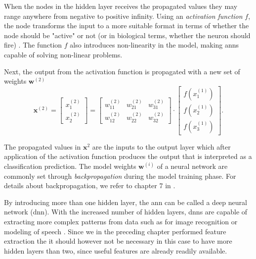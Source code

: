 When the nodes in the hidden layer receives the propagated values they may range anywhere from negative to positive infinity. Using an \textit{activation function} $f$, the node transforms the input to a more suitable format in terms of whether the node should be "active" or not (or in biological terms, whether the neuron should fire) \citep{kriesel_2007}. The function $f$ also introduces non-linearity in the model, making \gls{ann}s capable of solving non-linear problems. 

Next, the output from the activation function is propagated with a new set of weights $\mathbf{w}^{(2)}$
\begin{equation}
	\mathbf{x}^{(2)}=\begin{bmatrix}x_1^{(2)} \\ x_2^{(2)} \end{bmatrix} = 
	\begin{bmatrix} w_{11}^{(2)} & w_{21}^{(2)} & w_{31}^{(2)} \\ w_{12}^{(2)} & w_{22}^{(2)} & w_{32}^{(2)} \end{bmatrix}\cdot \begin{bmatrix}f(x_1^{(1)}) \\ f(x_2^{(1)}) \\ f(x_3^{(1)}) \end{bmatrix}.
\end{equation}

The propagated values in $\mathbf{x}^2$ are the inputs to the output layer which after application of the activation function produces the output that is interpreted as a classification prediction. The model weights $\mathbf{w}^{(i)}$ of a neural network are commonly set through \textit{backpropagation} during the model training phase. For details about backpropagation, we refer to chapter 7 in \citep{rojas_1996}.

By introducing more than one hidden layer, the \gls{ann} can be called a deep neural network (\gls{dnn}). With the increased number of hidden layers, \gls{dnn}s are capable of extracting more complex patterns from data such as for image recognition \citep{szegedy_liu_jia_sermanet_reed_anguelov_erhan_vanhoucke_rabinovich_2018} or modeling of speech \citep{hinton_deng_yu_dahl_mohamed_jaitly_senior_vanhoucke_nguyen_sainath_2012}. Since we in the preceding chapter performed feature extraction the it should however not be necessary in this case to have more hidden layers than two, since useful features are already readily available.

